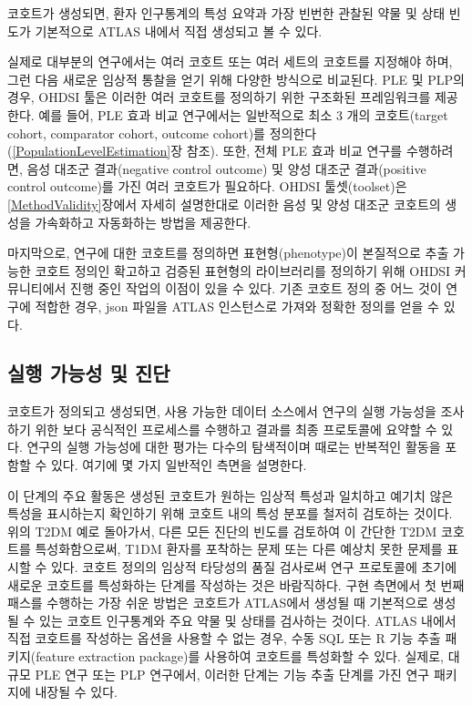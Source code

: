 \documentclass[11pt]{book}
\theoremstyle{definition}
\theoremstyle{definition}
\theoremstyle{definition}
\theoremstyle{remark}
\begin{document}
코호트가 생성되면, 환자 인구통계의 특성 요약과 가장 빈번한 관찰된 약물
및 상태 빈도가 기본적으로 ATLAS 내에서 직접 생성되고 볼 수 있다.

실제로 대부분의 연구에서는 여러 코호트 또는 여러 세트의 코호트를
지정해야 하며, 그런 다음 새로운 임상적 통찰을 얻기 위해 다양한 방식으로
비교된다. PLE 및 PLP의 경우, OHDSI 툴은 이러한 여러 코호트를 정의하기
위한 구조화된 프레임워크를 제공한다. 예를 들어, PLE 효과 비교 연구에서는
일반적으로 최소 3 개의 코호트(target cohort, comparator cohort, outcome
cohort)를 정의한다(\ref{PopulationLevelEstimation}장 참조). 또한, 전체
PLE 효과 비교 연구를 수행하려면, 음성 대조군 결과(negative control
outcome) 및 양성 대조군 결과(positive control outcome)를 가진 여러
코호트가 필요하다. OHDSI 툴셋(toolset)은 \ref{MethodValidity}장에서
자세히 설명한대로 이러한 음성 및 양성 대조군 코호트의 생성을 가속화하고
자동화하는 방법을 제공한다.

마지막으로, 연구에 대한 코호트를 정의하면 표현형(phenotype)이 본질적으로
추출 가능한 코호트 정의인 확고하고 검증된 표현형의 라이브러리를 정의하기
위해 OHDSI 커뮤니티에서 진행 중인 작업의 이점이 있을 수 있다. 기존
코호트 정의 중 어느 것이 연구에 적합한 경우, json 파일을 ATLAS
인스턴스로 가져와 정확한 정의를 얻을 수 있다.

\subsection{실행 가능성 및 진단}\label{Feasibility}

 

코호트가 정의되고 생성되면, 사용 가능한 데이터 소스에서 연구의 실행
가능성을 조사하기 위한 보다 공식적인 프로세스를 수행하고 결과를 최종
프로토콜에 요약할 수 있다. 연구의 실행 가능성에 대한 평가는 다수의
탐색적이며 때로는 반복적인 활동을 포함할 수 있다. 여기에 몇 가지
일반적인 측면을 설명한다.

이 단계의 주요 활동은 생성된 코호트가 원하는 임상적 특성과 일치하고
예기치 않은 특성을 표시하는지 확인하기 위해 코호트 내의 특성 분포를
철저히 검토하는 것이다. 위의 T2DM 예로 돌아가서, 다른 모든 진단의 빈도를
검토하여 이 간단한 T2DM 코호트를 특성화함으로써, T1DM 환자를 포착하는
문제 또는 다른 예상치 못한 문제를 표시할 수 있다. 코호트 정의의 임상적
타당성의 품질 검사로써 연구 프로토콜에 초기에 새로운 코호트를 특성화하는
단계를 작성하는 것은 바람직하다. 구현 측면에서 첫 번째 패스를 수행하는
가장 쉬운 방법은 코호트가 ATLAS에서 생성될 때 기본적으로 생성될 수 있는
코호트 인구통계와 주요 약물 및 상태를 검사하는 것이다. ATLAS 내에서 직접
코호트를 작성하는 옵션을 사용할 수 없는 경우, 수동 SQL 또는 R 기능 추출
패키지(feature extraction package)를 사용하여 코호트를 특성화할 수 있다.
실제로, 대규모 PLE 연구 또는 PLP 연구에서, 이러한 단계는 기능 추출
단계를 가진 연구 패키지에 내장될 수 있다.
\end{document}
